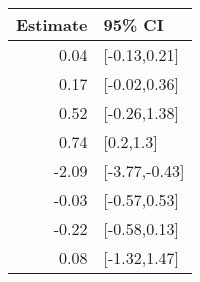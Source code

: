 \begin{tabular}{rl}
  \hline
Estimate & 95\% CI \\ 
  \hline
0.04 & [-0.13,0.21] \\ 
  0.17 & [-0.02,0.36] \\ 
  0.52 & [-0.26,1.38] \\ 
  0.74 & [0.2,1.3] \\ 
  -2.09 & [-3.77,-0.43] \\ 
  -0.03 & [-0.57,0.53] \\ 
  -0.22 & [-0.58,0.13] \\ 
  0.08 & [-1.32,1.47] \\ 
   \hline
\end{tabular}

